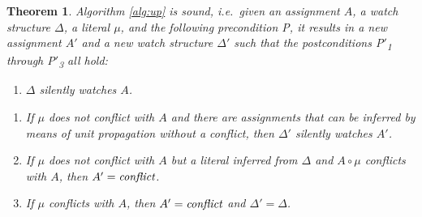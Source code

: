 \documentclass[final]{vutinfth} %
\newtheorem{theorem}{Theorem}[chapter]
\newcommand{\ass}{A}
\newcommand{\sgl}{\mu}
\begin{document}
\begin{theorem}
Algorithm \ref{alg:up} is sound, i.e.~given an assignment $\ass$, a watch structure $\Delta$, a literal $\sgl$, and the following precondition \textsc{P}, it results in a new assignment $\ass'$ and a new watch structure $\Delta'$ such that the postconditions \textsc{P$'$\textsubscript{1}} through \textsc{P$'$\textsubscript{3}} all hold:
\begin{enumerate}[label={\normalfont \textsc{P} ~},ref=\textsc{Pre},leftmargin=\widthof{\textsc{P$'$\textsubscript{3}}}+\labelsep]
\item $\Delta$ silently watches $A$. \label{up:sound:pre}
\end{enumerate}
\begin{enumerate}[label={\normalfont \textsc{P$'$\textsubscript{\arabic*}}},ref=\textsc{P$'$\textsubscript{\arabic*}},leftmargin=\widthof{\textsc{P$'$\textsubscript{3}}}+\labelsep]
\item If $\sgl$ does not conflict with $\ass$ and there are assignments that can be inferred by means of unit propagation without a conflict, then $\Delta'$ silently watches $\ass'$. \label{up:sound:post2}
\item If $\sgl$ does not conflict with $\ass$ but a literal inferred from $\Delta$ and $\ass \circ \sgl$ conflicts with $\ass$, then $\ass' = \emph{conflict}$. \label{up:sound:post3}
\item If $\sgl$ conflicts with $\ass$, then $\ass' = \emph{conflict}$ and $\Delta' = \Delta$. \label{up:sound:post1}%
\end{enumerate}
\end{theorem}
\newpage
\end{document}
